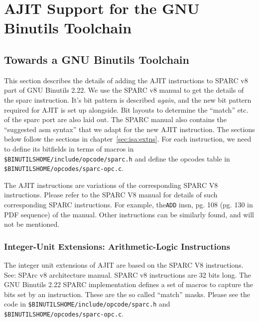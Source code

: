 \chapter{AJIT Support for the GNU Binutils Toolchain}
\label{chap:amv:work}

\section{Towards a GNU Binutils Toolchain}
\label{sec:binutils:support}

This section describes the details  of adding the AJIT instructions to
SPARC v8 part of GNU Binutils 2.22.  We use the SPARC v8 manual to get
the details of  the sparc instruction.  It's bit  pattern is described
\emph{again}, and  the new  bit pattern  required for  AJIT is  set up
alongside.  Bit layouts to determine  the ``match'' etc.  of the sparc
port  are  also  laid  out.    The  SPARC  manual  also  contains  the
``suggested asm syntax''  that we adapt for the  new AJIT instruction.
The sections below follow the sections in chapter~\ref{sec:isa:extns}.
For each  instruction, we  need to  define its  bitfields in  terms of
macros  in  \texttt{\$BINUTILSHOME/include/opcode/sparc.h} and  define
the opcodes table in \texttt{\$BINUTILSHOME/opcodes/sparc-opc.c}.

The AJIT  instructions are  variations of  the corresponding  SPARC V8
instructions.  Please refer to the SPARC V8 manual for details of such
corresponding SPARC  instructions. For example,  the\texttt{ADD} insn,
pg. 108 (pg.  130 in PDF sequence) of the  manual.  Other instructions
can be similarly found, and will not be mentioned.

\subsection{Integer-Unit Extensions: Arithmetic-Logic Instructions}
\label{sec:integer-unit-extns:arith-logic-insns:impl}

The  integer  unit extensions  of  AJIT  are  based  on the  SPARC  V8
instructions.    See:  SPArc   v8  architecture   manual.   SPARC   v8
instructions  are  32   bits  long.   The  GNU   Binutils  2.22  SPARC
implementation defines a  set of macros to capture the  bits set by an
instruction.  These are the so called ``match'' masks.  Please see the
code     in     \texttt{\$BINUTILSHOME/include/opcode/sparc.h}     and
\texttt{\$BINUTILSHOME/opcodes/sparc-opc.c}.
\vfill
\newpage






